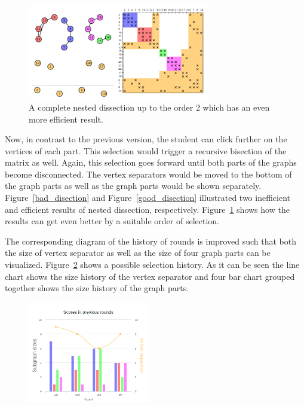 \documentclass[12pt, twoside]{book}
\begin{document}
\begin{figure}
\centering
\includegraphics[width=0.7\textwidth]{good_disection2}
\caption{A complete nested dissection up to the order 2 which has an
even more efficient result.}
\label{good_disection2}
\end{figure}

Now, in contrast to the previous version, the student can click further
on the vertices of each part. This selection would trigger a recursive
bisection of the matrix as well. Again, this selection goes forward until
both parts of the graphs become disconnected. The vertex separators
would be moved to the bottom of the graph parts as well as the graph parts
would be shown separately. Figure~\ref{bad_disection} and Figure~\ref{good_disection} illustrated two inefficient and efficient results of nested dissection,
respectively. Figure~\ref{good_disection2} shows how the results can
get even better by a suitable order of selection.


The corresponding diagram of the history of rounds is improved such that
both the size of vertex separator as well as the size of four graph parts
can be visualized. Figure~\ref{barchart} shows a possible selection history.
As it can be seen the line chart shows the size history of the vertex separator
and four bar chart grouped together shows the size history of the graph parts.

\begin{figure}
\centering
\includegraphics[width=0.47\textwidth]{chart2}
\caption{}
\label{barchart}
\end{figure}
\end{document}
